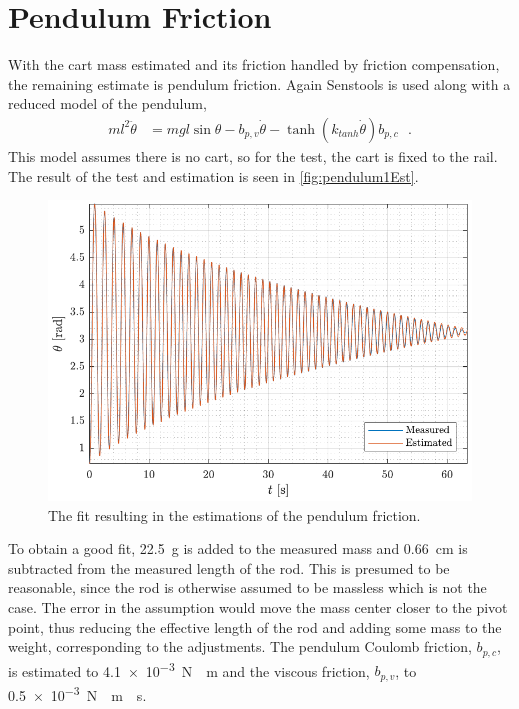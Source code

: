 \section{Pendulum Friction}
With the cart mass estimated and its friction handled by friction compensation, the remaining estimate is pendulum friction. Again Senstools is used along with a reduced model of the pendulum,
%
\begin{align}
  m l ^2 \ddot{\theta} &= m g l  \sin \theta - b_{p,v} \dot{\theta} - \tanh(k_{tanh} \dot{\theta}) b_{p,c} \ \ \ .
  \label{eq:reducedForPendulum1Estimation}
\end{align}
%
This model assumes there is no cart, so for the test, the cart is fixed to the rail. The result of the test and estimation is seen in \autoref{fig:pendulum1Est}.
%
\begin{figure}[H]
  \includegraphics[width=.7\textwidth]{figures/pendulum1Est}
  \caption{The fit resulting in the estimations of the pendulum friction.}
  \label{fig:pendulum1Est}
\end{figure}
%
To obtain a good fit, \SI{22.5}{g} is added to the measured mass and \SI{0.66}{cm} is subtracted from the measured length of the rod. This is presumed to be reasonable, since the rod is otherwise assumed to be massless which is not the case. The error in the assumption would move the mass center closer to the pivot point, thus reducing the effective length of the rod and adding some mass to the weight, corresponding to the adjustments. The pendulum Coulomb friction, $b_{p,c}$, is estimated to \SI{4.1e-3}{N\cdot m} and the viscous friction, $b_{p,v}$, to \SI{0.5e-3}{N\cdot m\cdot s}.

